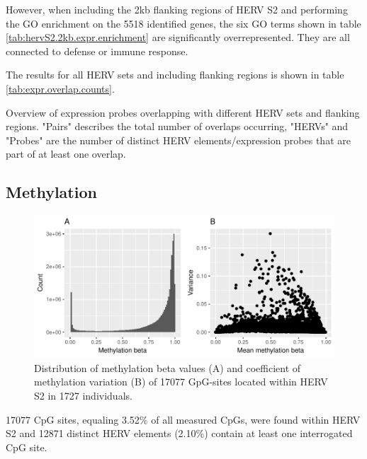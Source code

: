 \documentclass[a4paper,12pt,twoside,openright]{report}
\begin{document}
However, when including the 2kb flanking regions of HERV S2 and performing the GO enrichment on the 5518 identified genes, the six GO terms shown in table \ref{tab:hervS2.2kb.expr.enrichment} are significantly overrepresented. They are all connected to defense or immune response.

The results for all HERV sets and including flanking regions is shown in table \ref{tab:expr.overlap.counts}.

\begin{table}[h!]
  \begin{center}
  \end{center}        
	\caption{Overview of expression probes overlapping with different HERV sets and flanking regions. "Pairs" describes the total number of overlaps occurring, "HERVs" and "Probes" are the number of distinct HERV elements/expression probes that are part of at least one overlap.}
	\label{tab:expr.overlap.counts}
\end{table}

\subsection{Methylation}
\label{Results:Methylation}
\begin{figure}[tb]
	\includegraphics[scale = 1, keepaspectratio = true]{../figures/hervS2_meth_raw_hist_var}  
	\caption{Distribution of methylation beta values (A) and coefficient of methylation variation (B) of 17077 GpG-sites located within HERV S2 in 1727 individuals.}
    \label{fig:hervS2.meth.hist.var}
\end{figure}
17077 CpG sites, equaling 3.52\% of all measured CpGs, were found within HERV S2 and 12871 distinct HERV elements (2.10\%) contain at least one interrogated CpG site.
\end{document}
